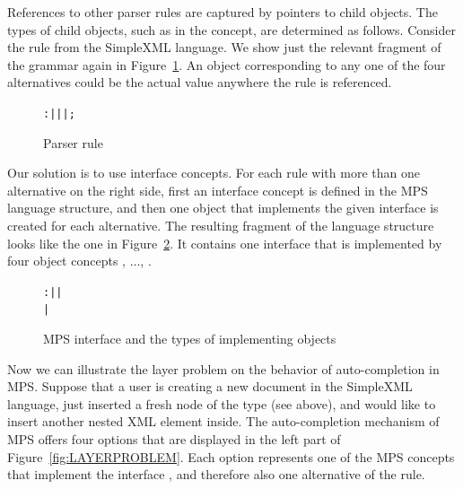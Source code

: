 References to other parser rules are captured by pointers to child objects.
The types of child objects, such as  in the  concept, are determined as follows.
Consider the  rule from the SimpleXML language.
We show just the relevant fragment of the grammar again in Figure~\ref{fig:CONTENTRULE}.
An object corresponding to any one of the four alternatives could be the actual value anywhere the  rule is referenced.

\begin{figure}[ht]
\centering
\begin{alltt}
\small
{} :  |  |  |  ;
\end{alltt}
\caption{Parser rule }
\label{fig:CONTENTRULE}
\end{figure}

Our solution is to use interface concepts.
For each rule with more than one alternative on the right side, first an interface concept is defined in the MPS language structure, and then one object that implements the given interface is created for each alternative.
The resulting fragment of the language structure looks like the one in Figure~\ref{fig:ICONTENTITF}.
It contains one interface  that is implemented by four object concepts , $\ldots$, .

\begin{figure}[ht]
\centering
\begin{alltt}
\small
{} :  |  |
            | 
\end{alltt}
\caption{MPS interface  and the types of implementing objects}
\label{fig:ICONTENTITF}
\end{figure}

Now we can illustrate the layer problem on the behavior of auto-completion in MPS.
Suppose that a user is creating a new document in the SimpleXML language, just inserted a fresh node of the type  (see above), and would like to insert another nested XML element inside.
The auto-completion mechanism of MPS offers four options that are displayed in the left part of Figure~\ref{fig:LAYERPROBLEM}.
Each option represents one of the MPS concepts that implement the interface , and therefore also one alternative of the  rule.


